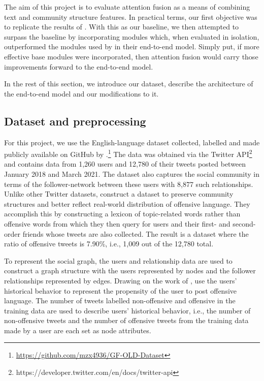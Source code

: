 \documentclass[letterpaper]{article} %
\begin{document}
The aim of this project is to evaluate attention fusion as a means of combining text and community structure features. In practical terms, our first objective was to replicate the results of \citet{Miao2022}. With this as our baseline, we then attempted to surpass the baseline by incorporating modules which, when evaluated in isolation, outperformed the modules used by \citet{Miao2022} in their end-to-end model. Simply put, if more effective base modules were incorporated, then attention fusion would carry those improvements forward to the end-to-end model.

In the rest of this section, we introduce our dataset, describe the architecture of the end-to-end model and our modifications to it. 

\subsection{Dataset and preprocessing}

For this project, we use the English-language dataset collected, labelled and made publicly available on GitHub by \citet{Miao2022}.\footnote{\url{https://github.com/mzx4936/GF-OLD-Dataset}} The data was obtained via the Twitter API\footnote{https://developer.twitter.com/en/docs/twitter-api} and contains data from 1,260 users and 12,780 of their tweets posted between January 2018 and March 2021. The dataset also captures the social community in terms of the follower-network between these users with 8,877 such relationships. Unlike other Twitter datasets, \citet{Miao2022} construct a dataset to preserve community structures and better reflect real-world distribution of offensive language. They accomplish this by constructing a lexicon of topic-related words rather than offensive words from which they then query for users and their first- and second-order friends whose tweets are also collected. The result is a dataset where the ratio of offensive tweets is 7.90\%, i.e., 1,009 out of the 12,780 total.

To represent the social graph, the users and relationship data are used to construct a graph structure with the users represented by nodes and the follower relationships represented by edges. Drawing on the work of \citet{Mishra2019}, \citet{Miao2022} use the users' historical behavior to represent the propensity of the user to post offensive language. The number of tweets labelled non-offensive and offensive in the training data are used to describe users' historical behavior, i.e., the number of non-offensive tweets and the number of offensive tweets from the training data made by a user are each set as node attributes.
\end{document}
